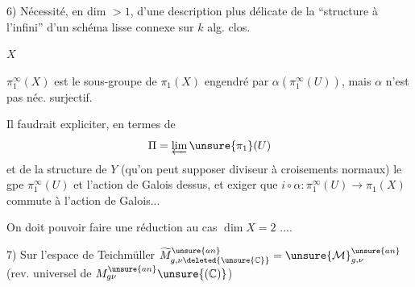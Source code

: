 6) Nécessité, en dim $>1$, d'une description plus délicate de la ``structure à l'infini'' d'un schéma lisse connexe  sur $k$ alg. clos.

$X$


$\pi_1^\infty(X)$ est le sous-groupe   de $\pi_1(X)$ engendré par $\alpha(\pi_1^\infty(U))$, mais $\alpha$ n'est pas néc. surjectif.

Il faudrait expliciter,  en termes de
\[
\Pi=\varprojlim\unsure{\pi_1}(U)
\]
et de la structure  de $Y$ (qu'on peut supposer diviseur à croisements normaux) le gpe $\pi_1^\infty(U)$ et l'action de Galois dessus, et exiger que  $i\circ\alpha:\pi_1^\infty(U)\longrightarrow\pi_1(X)$ commute à l'action de Galois...

On doit pouvoir  faire une réduction au cas $\dim X=2$ ....

7) Sur l'espace de Teichmüller  $\widetilde M_{g,\nu\deleted{\unsure{\mathbb C}}}^{\unsure{an}}=\unsure{\mathcal M}_{g,\nu}^{\unsure{an}}$ (rev. universel de   $M_{g\nu}^{\unsure{an}}\unsure{(\mathbb C)}$)

